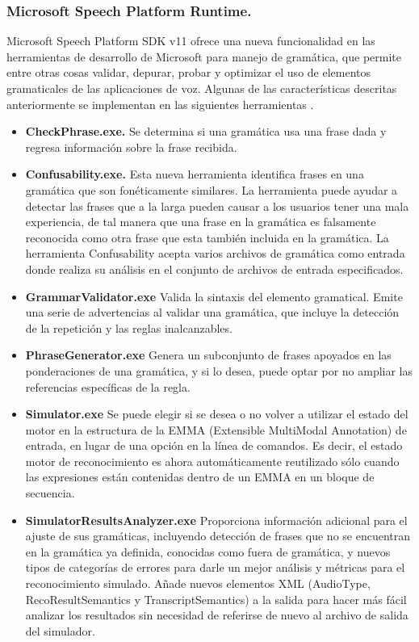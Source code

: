 \documentclass[11pt,a4paper]{article}
\begin{document}
\subsubsection{Microsoft Speech Platform Runtime.}
Microsoft Speech Platform SDK v11 ofrece una nueva funcionalidad en las herramientas de desarrollo de Microsoft para manejo de gramática, que permite entre otras cosas validar, depurar, probar y optimizar el uso de elementos gramaticales de las aplicaciones de voz. Algunas de las características descritas anteriormente se implementan en las siguientes herramientas \nocite{Microsoft_sdn}.
\begin{itemize}
	\item \textbf{CheckPhrase.exe.} Se determina si una gramática usa una frase dada y regresa información sobre la frase recibida. %
	\item \textbf{Confusability.exe.} Esta nueva herramienta identifica frases en una gramática que son fonéticamente similares. La herramienta puede ayudar a detectar las frases que a la larga pueden causar a los usuarios tener una mala experiencia, de tal manera que una frase en la gramática es falsamente reconocida como otra frase que esta también incluida en la gramática. La herramienta Confusability acepta varios archivos de gramática como entrada donde realiza su análisis en el conjunto de archivos de entrada especificados.
	\item \textbf{GrammarValidator.exe} Valida la sintaxis del elemento gramatical. Emite una serie de advertencias al validar una gramática, que incluye la detección de la 			repetición y las reglas inalcanzables.
	\item \textbf{PhraseGenerator.exe} Genera un subconjunto de frases apoyados en las ponderaciones de una gramática, y si lo desea, puede optar por no ampliar las referencias específicas de la regla.
	\item \textbf{Simulator.exe} Se puede elegir si se desea o no volver a utilizar el estado del motor en la estructura de la \gls{EMMA} (Extensible MultiModal Annotation) de entrada, en lugar de una opción en la línea de comandos. Es decir, el estado motor de reconocimiento es ahora automáticamente reutilizado sólo cuando las expresiones están contenidas dentro de un EMMA en un bloque de secuencia.  %
	\item \textbf{SimulatorResultsAnalyzer.exe} Proporciona información adicional para el ajuste de sus gramáticas, incluyendo detección de frases que no se encuentran en la gramática ya definida, conocidas como fuera de gramática, y nuevos tipos de categorías de errores para darle un mejor análisis y métricas para el reconocimiento simulado. Añade nuevos elementos XML (AudioType, RecoResultSemantics y TranscriptSemantics) a la salida para hacer más fácil analizar los resultados sin necesidad de referirse de nuevo al archivo de salida del simulador.
\end{itemize} 
\end{document}
